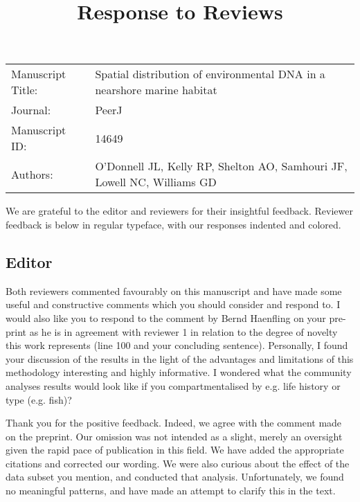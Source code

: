 \documentclass{article}
\newenvironment{response}
	{
	\begin{adjustwidth}{1cm}{0cm}
	\color{peerjBlue}
	}
	{
	\end{adjustwidth}
	}
\begin{document}
\title{Response to Reviews}

\maketitle


\begin{tabular}{ l l }
Manuscript Title: &
Spatial distribution of environmental DNA in a nearshore marine habitat
\\
Journal: &
PeerJ
\\
Manuscript ID: &
14649
\\
Authors: &
O'Donnell JL,
Kelly RP,
Shelton AO,
Samhouri JF,
Lowell NC,
Williams GD
\\
\end{tabular}

\bigskip

We are grateful to the editor and reviewers for their insightful feedback.
Reviewer feedback is below in regular typeface, with our responses indented and colored.

\subsection*{Editor}
Both reviewers commented favourably on this manuscript and have made some useful and constructive comments which you should consider and respond to. I would also like you to respond to the comment by Bernd Haenfling on your pre-print as he is in agreement with reviewer 1 in relation to the degree of novelty this work represents (line 100 and your concluding sentence). Personally, I found your discussion of the results in the light of the advantages and limitations of this methodology interesting and highly informative. I wondered what the community analyses results would look like if you compartmentalised by e.g. life history or type (e.g. fish)?

\begin{response}
  Thank you for the positive feedback.
	Indeed, we agree with the comment made on the preprint. Our omission was not intended as a slight, merely an oversight given the rapid pace of publication in this field.
	We have added the appropriate citations and corrected our wording.
	We were also curious about the effect of the data subset you mention, and conducted that analysis. Unfortunately, we found no meaningful patterns, and have made an attempt to clarify this in the text.
	\\
\end{response}
\end{document}
